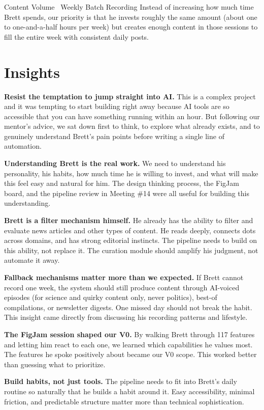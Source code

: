 \documentclass[11pt,a4paper]{article}
\begin{document}
\begin{pivotcard}{Content Volume \textrightarrow\ Weekly Batch Recording}
Instead of increasing how much time Brett spends, our priority is that he invests roughly the same amount (about one to one-and-a-half hours per week) but creates enough content in those sessions to fill the entire week with consistent daily posts.
\end{pivotcard}

\section{Insights}

\begin{insightcard}
\textbf{Resist the temptation to jump straight into AI.} This is a complex project and it was tempting to start building right away because AI tools are so accessible that you can have something running within an hour. But following our mentor's advice, we sat down first to think, to explore what already exists, and to genuinely understand Brett's pain points before writing a single line of automation.

\textbf{Understanding Brett is the real work.} We need to understand his personality, his habits, how much time he is willing to invest, and what will make this feel easy and natural for him. The design thinking process, the FigJam board, and the pipeline review in Meeting \#14 were all useful for building this understanding.

\textbf{Brett is a filter mechanism himself.} He already has the ability to filter and evaluate news articles and other types of content. He reads deeply, connects dots across domains, and has strong editorial instincts. The pipeline needs to build on this ability, not replace it. The curation module should amplify his judgment, not automate it away.

\textbf{Fallback mechanisms matter more than we expected.} If Brett cannot record one week, the system should still produce content through AI-voiced episodes (for science and quirky content only, never politics), best-of compilations, or newsletter digests. One missed day should not break the habit. This insight came directly from discussing his recording patterns and lifestyle.

\textbf{The FigJam session shaped our V0.} By walking Brett through 117 features and letting him react to each one, we learned which capabilities he values most. The features he spoke positively about became our V0 scope. This worked better than guessing what to prioritize.

\textbf{Build habits, not just tools.} The pipeline needs to fit into Brett's daily routine so naturally that he builds a habit around it. Easy accessibility, minimal friction, and predictable structure matter more than technical sophistication.
\end{insightcard}
\end{document}

